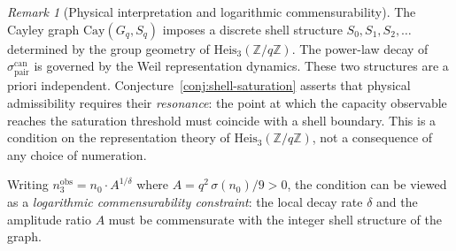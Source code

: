 \documentclass[11pt,a4paper]{article}
\theoremstyle{definition}
\theoremstyle{remark}
\newtheorem{remark}[theorem]{Remark}
\begin{document}
  \begin{remark}[Physical interpretation and logarithmic
  commensurability]
    \label{rem:physical-interp}
    The Cayley graph $\mathrm{Cay}(G_q, S_q)$ imposes a discrete
    shell structure $S_0, S_1, S_2, \ldots$ determined by the
    group geometry of $\mathrm{Heis}_3(\mathbb{Z}/q\mathbb{Z})$.
    The power-law decay of $\sigma_{\mathrm{pair}}^{\mathrm{can}}$
    is governed by the Weil representation dynamics.
    These two structures are a priori independent.
    Conjecture~\ref{conj:shell-saturation} asserts that physical
    admissibility requires their \emph{resonance}: the point at
    which the capacity observable reaches the saturation
    threshold must coincide with a shell boundary.
    This is a condition on the representation theory of
    $\mathrm{Heis}_3(\mathbb{Z}/q\mathbb{Z})$, not a consequence
    of any choice of numeration.

    Writing $n_3^{\mathrm{obs}} = n_0 \cdot A^{1/\delta}$ where
    $A = q^2\,\sigma(n_0)/9 > 0$, the condition can be viewed
    as a \emph{logarithmic commensurability constraint}: the
    local decay rate $\delta$ and the amplitude ratio $A$ must
    be commensurate with the integer shell structure of the
    graph.
  \end{remark}
\end{document}
